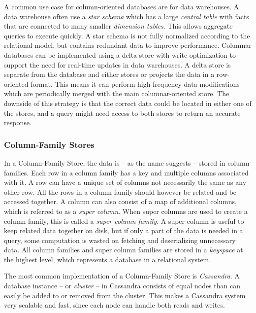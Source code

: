 A common use case for column-oriented databases are for data warehouses.
A data warehouse often use a \emph{star schema} which has a large \emph{central table} with facts that are connected to many smaller \emph{dimension tables}. This allows aggregate queries to execute quickly. A star schema is not fully normalized according to the relational model, but contains redundant data to improve performance.
Columnar databases can be implemented using a delta store with write optimization to support the need for real-time updates in data warehouses. A delta store is separate from the database and either stores or projects the data in a row-oriented format. This means it can perform high-frequency data modifications which are periodically merged with the main columnar-oriented store. The downside of this strategy is that the correct data could be located in either one of the stores, and a query might need access to both stores to return an accurate response.

\subsubsection{Column-Family Stores}

In a Column-Family Store, the data is -- as the name suggests -- stored in column families. Each row in a column family has a key and multiple columns associated with it. A row can have a unique set of columns not necessarily the same as any other row. All the rows in a column family should however be related and be accessed together. A column can also consist of a map of additional columns, which is referred to as a \emph{super column}. When super columns are used to create a column family, this is called a \emph{super column family}. A super column is useful to keep related data together on disk, but if only a part of the data is needed in a query, some computation is wasted on fetching and deserializing unnecessary data. All column families and super column families are stored in a \emph{keyspace} at the highest level, which represents a database in a relational system.

The most common implementation of a Column-Family Store is \emph{Cassandra}. A database instance -- or \emph{cluster} -- in Cassandra consists of equal nodes than can easily be added to or removed from the cluster. This makes a Cassandra system very scalable and fast, since each node can handle both reads and writes.

